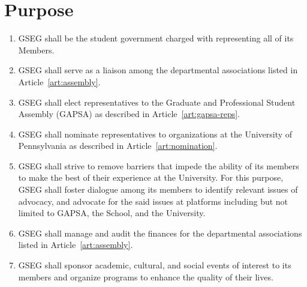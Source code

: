 \chapter{Purpose}

\begin{enumerate}[label=\Alph*.]
	\item GSEG shall be the student government charged with
	representing all of its Members. 
	\item GSEG shall serve as a liaison among the departmental
	associations listed in Article~\ref{art:assembly}. 
	\item GSEG shall elect representatives to the Graduate and
	Professional Student Assembly (GAPSA) as described in 
	Article~\ref{art:gapsa-reps}.
	\item GSEG shall nominate representatives to organizations at the
	University of Pennsylvania as described in 
	Article~\ref{art:nomination}.
	\item GSEG shall strive to remove barriers that impede the
	ability of its members to make the best of their experience at 
	the University. For this purpose, GSEG shall foster dialogue
	among its members to identify relevant issues of advocacy, and
	advocate for the said issues at platforms including but not
	limited to GAPSA, the School, and the University.
	\item GSEG shall manage and audit the finances for the
	departmental associations listed in Article~\ref{art:assembly}.
	\item GSEG shall sponsor academic, cultural, and social events of interest to its members and organize programs to enhance the quality of their lives.
\end{enumerate}